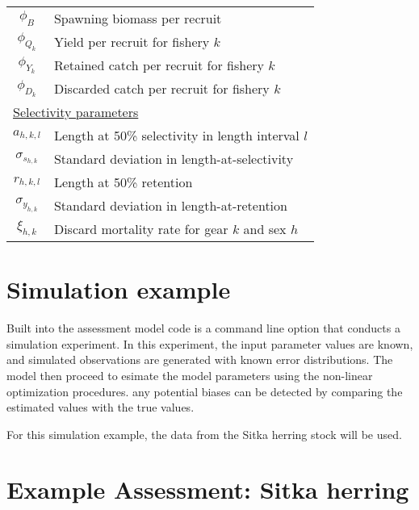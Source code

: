 \documentclass[12pt,letterpaper]{article}
\begin{document}
\begin{table}
\begin{tabular}{cl}
      $\phi_B$    & Spawning biomass per recruit \\
      $\phi_{Q_k}$& Yield per recruit for fishery $k$\\
      $\phi_{Y_k}$& Retained catch per recruit for fishery $k$ \\
      $\phi_{D_k}$& Discarded catch per recruit for fishery $k$ \\
  \multicolumn{2}{l}{\underline{Selectivity parameters}} \\
      $a_{h,k,l}$ & Length at 50\% selectivity in length interval $l$\\
      $\sigma_{s_{h,k}}$ & Standard deviation in length-at-selectivity\\
      $r_{h,k,l}$ & Length at 50\% retention\\
      $\sigma_{y_{h,k}}$ & Standard deviation in length-at-retention\\
      $\xi_{h,k}$ & Discard mortality rate for gear $k$ and sex $h$\\
  \hline
  \end{tabular}
\end{table}


  
  \section{Simulation example} %
  \label{sec:simulation_example}
  
  Built into the assessment model code is a command line option that conducts a simulation experiment.  In this experiment, the input parameter values are known, and simulated observations are generated with known error distributions. The model then proceed to esimate the model parameters using the non-linear optimization procedures.  any potential biases can be detected by comparing the estimated values with the true values. 

  For this simulation example, the data from the Sitka herring stock will be used.




  \section{Example Assessment: Sitka herring} %
  \label{sec:example_assessment_sitka_herring}
  


  
  
\end{document}
